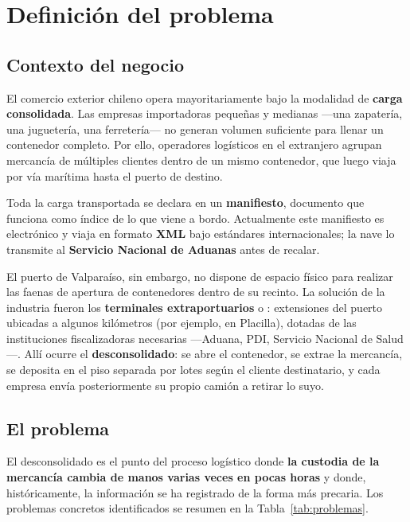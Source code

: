 \chapter{Definición del problema}
\label{cap:problema}

\section{Contexto del negocio}
\label{sec:contexto}

El comercio exterior chileno opera mayoritariamente bajo la modalidad de \textbf{carga
consolidada}. Las empresas importadoras pequeñas y medianas ---una zapatería, una juguetería, una
ferretería--- no generan volumen suficiente para llenar un contenedor completo. Por ello,
operadores logísticos en el extranjero agrupan mercancía de múltiples clientes dentro de un mismo
contenedor, que luego viaja por vía marítima hasta el puerto de destino.

Toda la carga transportada se declara en un \textbf{manifiesto}, documento que funciona como índice
de lo que viene a bordo. Actualmente este manifiesto es electrónico y viaja en formato \textbf{XML}
bajo estándares internacionales; la nave lo transmite al \textbf{Servicio Nacional de Aduanas}
antes de recalar.

El puerto de Valparaíso, sin embargo, no dispone de espacio físico para realizar las faenas de
apertura de contenedores dentro de su recinto. La solución de la industria fueron los
\textbf{terminales extraportuarios} o : extensiones del puerto ubicadas a
algunos kilómetros (por ejemplo, en Placilla), dotadas de las instituciones fiscalizadoras
necesarias ---Aduana, PDI, Servicio Nacional de Salud---. Allí ocurre el \textbf{desconsolidado}:
se abre el contenedor, se extrae la mercancía, se deposita en el piso separada por lotes según el
cliente destinatario, y cada empresa envía posteriormente su propio camión a retirar lo suyo.

\section{El problema}
\label{sec:elproblema}

\begin{nota}
\end{nota}

El desconsolidado es el punto del proceso logístico donde \textbf{la custodia de la mercancía
cambia de manos varias veces en pocas horas} y donde, históricamente, la información se ha
registrado de la forma más precaria. Los problemas concretos identificados se resumen en la
Tabla~\ref{tab:problemas}.

